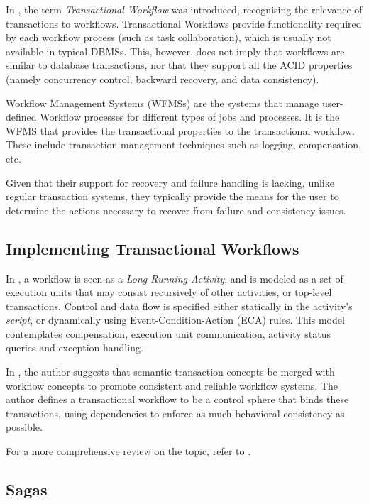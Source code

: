 In \cite{sheth1993transactional}, the term {\it Transactional
  Workflow} was introduced, recognising the relevance of transactions
to workflows. Transactional Workflows provide functionality required
by each workflow process (such as task collaboration), which is
usually not available in typical DBMSs. This, however, does not imply
that workflows are similar to database transactions, nor that they
support all the ACID properties (namely concurrency control, backward
recovery, and data consistency).

Workflow Management Systems (WFMSs) are the systems that manage
user-defined Workflow processes for different types of jobs and
processes. It is the WFMS that provides the transactional properties
to the transactional workflow. These include transaction management
techniques such as logging, compensation, etc.

Given that their support for recovery and failure handling is lacking,
unlike regular transaction systems, they typically provide the means
for the user to determine the actions necessary to recover from
failure and consistency issues.

\subsection{Implementing Transactional Workflows}

In \cite{dayal1990organizing}, a workflow is seen as a {\it
  Long-Running Activity}, and is modeled as a set of execution units
that may consist recursively of other activities, or top-level
transactions. Control and data flow is specified either statically in
the activity's {\it script}, or dynamically using
Event-Condition-Action (ECA) rules. This model contemplates
compensation, execution unit communication, activity status queries
and exception handling.

In \cite{weikum1993extending}, the author suggests that semantic
transaction concepts be merged with workflow concepts to promote
consistent and reliable workflow systems. The author defines a
transactional workflow to be a control sphere that binds these
transactions, using dependencies to enforce as much behavioral
consistency as possible.

For a more comprehensive review on the topic, refer to
\cite{worah1997transactions}.

\subsection{Sagas}

